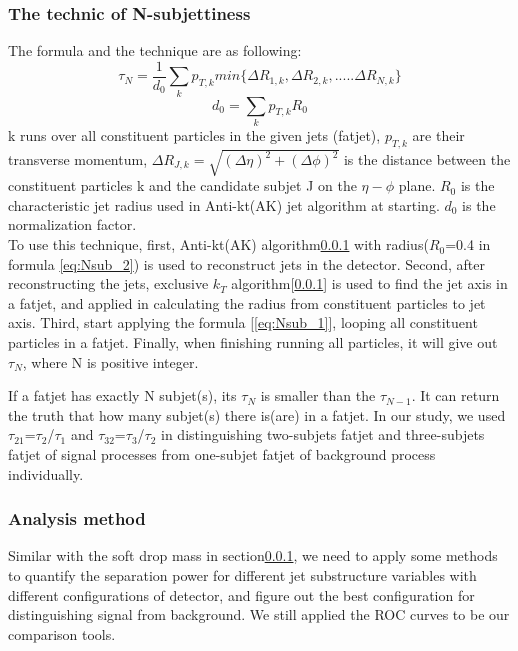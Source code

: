 \documentclass[12pt,twoside,a4paper,an,final]{cms-tdr}
\begin{document}
\subsubsection{The technic of N-subjettiness}
The formula and the technique are as following:\\
\begin{equation}\label{eq:Nsub_1}
\tau_{N}=\frac{1}{d_{0}}\sum_{k}p_{T,k} min\{\Delta R_{1,k},\Delta R_{2,k},.....\Delta R_{N,k}\}
\end{equation}
\begin{equation}\label{eq:Nsub_2}
d_{0}=\sum_{k}p_{T,k} R_{0}
\end{equation}
k runs over all constituent particles in the given jets (fatjet), $p_{T,k}$ are their transverse momentum, $\Delta R_{J,k}=\sqrt{(\Delta \eta)^{2}+(\Delta \phi)^{2}}$ is the distance between the constituent particles k and the candidate subjet J on the $\eta-\phi$ plane. $R_{0}$ is the characteristic jet radius used in Anti-kt(AK) jet algorithm at starting. $d_{0}$ is the normalization factor.\\

To use this technique, first, Anti-kt(AK) algorithm\ref{} with radius($R_{0}$=0.4 in formula \ref{eq:Nsub_2}) is used to reconstruct jets in the detector. Second, after reconstructing the jets, exclusive $k_{T}$ algorithm[\ref{}] is used to find the jet axis in a fatjet, and applied in calculating the radius from constituent particles to jet axis. Third, start applying the formula [\ref{eq:Nsub_1}], looping all constituent particles in a fatjet. Finally, when finishing running all particles, it will give out $\tau_{N}$, where N is positive integer. 

If a fatjet has exactly N subjet(s), its $\tau_{N}$ is smaller than the $\tau_{N-1}$. It can return the truth that how many subjet(s) there is(are) in a fatjet. In our study, we used $\tau_{21}$=$\tau_{2}$/$\tau_{1}$  and $\tau_{32}$=$\tau_{3}$/$\tau_{2}$ in distinguishing two-subjets fatjet and three-subjets fatjet of signal processes from one-subjet fatjet of background process individually. \\ 

\subsubsection{Analysis method}\label{Analysis_method_for_Tau_C}
Similar with the soft drop mass in section\ref{}, we need to apply some methods to quantify the separation power for different jet substructure variables with different configurations of detector, and figure out the best configuration for distinguishing signal from background. We still applied the ROC curves to be our comparison tools. \\
\end{document}
